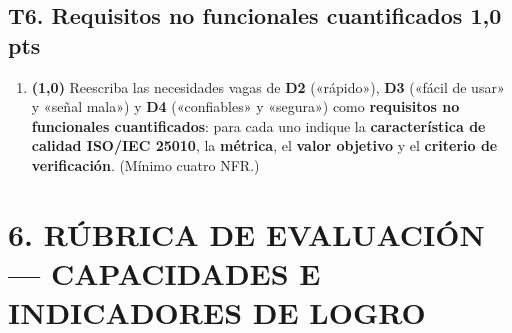 \documentclass[11pt]{article}
\newcommand{\pts}[1]{\hfill{\normalsize\textbf{\textcolor{utegreendk}{#1 pts}}}}
\begin{document}
\subsection*{T6. Requisitos no funcionales cuantificados \pts{1{,}0}}

\begin{enumerate}[label=\textbf{T6.\arabic*},leftmargin=26pt,itemsep=3pt]
  \item \textbf{(1{,}0)} Reescriba las necesidades vagas de \textbf{D2} («rápido»), \textbf{D3} («fácil de usar» y «señal mala») y \textbf{D4} («confiables» y «segura») como \textbf{requisitos no funcionales cuantificados}: para cada uno indique la \textbf{característica de calidad ISO/IEC 25010}, la \textbf{métrica}, el \textbf{valor objetivo} y el \textbf{criterio de verificación}. (Mínimo cuatro NFR.)
\end{enumerate}

\newpage
\section*{\textcolor{utegreendk}{6. RÚBRICA DE EVALUACIÓN — CAPACIDADES E INDICADORES DE LOGRO}}
\end{document}
